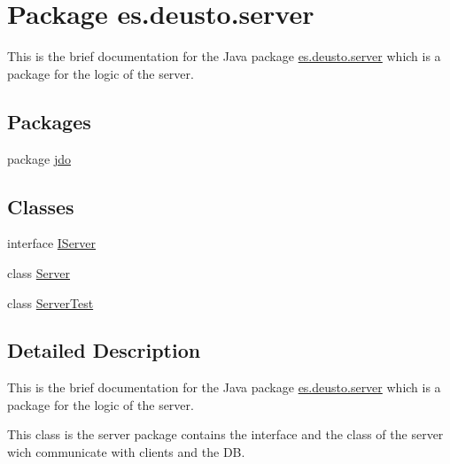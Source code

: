 \hypertarget{namespacees_1_1deusto_1_1server}{}\section{Package es.\+deusto.\+server}
\label{namespacees_1_1deusto_1_1server}


This is the brief documentation for the Java package \hyperlink{namespacees_1_1deusto_1_1server}{es.\+deusto.\+server} which is a package for the logic of the server.  


\subsection*{Packages}
\begin{DoxyCompactItemize}
\item 
package \hyperlink{namespacees_1_1deusto_1_1server_1_1jdo}{jdo}
\end{DoxyCompactItemize}
\subsection*{Classes}
\begin{DoxyCompactItemize}
\item 
interface \hyperlink{interfacees_1_1deusto_1_1server_1_1_i_server}{I\+Server}
\item 
class \hyperlink{classes_1_1deusto_1_1server_1_1_server}{Server}
\item 
class \hyperlink{classes_1_1deusto_1_1server_1_1_server_test}{Server\+Test}
\end{DoxyCompactItemize}


\subsection{Detailed Description}
This is the brief documentation for the Java package \hyperlink{namespacees_1_1deusto_1_1server}{es.\+deusto.\+server} which is a package for the logic of the server. 

This class is the server package contains the interface and the class of the server wich communicate with clients and the DB. 